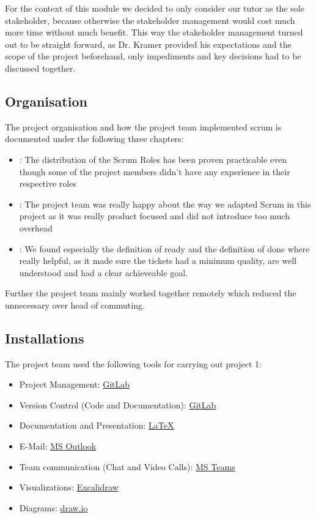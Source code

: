 For the context of this module we decided to only consider our tutor as the sole stakeholder,
because otherwise the stakeholder management would cost much more time without much benefit.
This way the stakeholder management turned out to be straight forward, as Dr. Kramer provided his expectations and the
scope of the project beforehand, only impediments and key decisions had to be discussed together.

\subsection{Organisation}\label{subsec:organisation}
The project organisation and how the project team implemented scrum is documented under the following three chapters:

\begin{itemize}
    \item {}: The distribution of the Scrum Roles has been proven practicable even though some of the project members didn't have any experience in their respective roles
    \item {}: The project team was really happy about the way we adapted Scrum in this project as it was really product focused and did not introduce too much overhead
    \item {}: We found especially the definition of ready and the definition of done where really helpful, as it made sure the tickets had a minimum quality, are well understood and had a clear achieveable goal.
\end{itemize}

Further the project team mainly worked together remotely which reduced the unnecessary over head of commuting.

\subsection{Installations}\label{subsec:installations}
The project team used the following tools for carrying out project 1:
\begin{itemize}
    \item Project Management: \href{https://about.gitlab.com/}{GitLab}
    \item Version Control (Code and Documentation): \href{https://about.gitlab.com/}{GitLab}
    \item Documentation and Presentation: \href{https://www.latex-project.org/}{LaTeX}
    \item E-Mail: \href{https://www.microsoft.com/en-us/microsoft-365/outlook/email-and-calendar-software-microsoft-outlook}{MS Outlook}
    \item Team communication (Chat and Video Calls): \href{https://www.microsoft.com/en-us/microsoft-teams/group-chat-software}{MS Teams}
    \item Visualizations: \href{https://excalidraw.com/}{Excalidraw}
    \item Diagrams: \href{https://www.drawio.com/}{draw.io}
\end{itemize}
